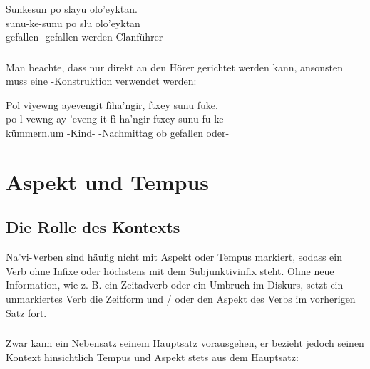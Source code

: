\begin{interlin}
	\glll \Npawl{}Sunkesun po slayu olo'eyktan. \\
	sunu-ke-sunu po slu olo'eyktan \\
	gefallen--gefallen  werden Clanführer \\
\end{interlin}

\subsubsection{} Man beachte, dass  nur direkt an den Hörer gerichtet werden kann, ansonsten muss eine -Konstruktion verwendet werden:

\begin{interlin}
	\glll \Npawl{}Pol vìyewng ayevengit fìha'ngir, ftxey sunu fuke. \\
	po-l vewng ay-'eveng-it fì-ha'ngir ftxey sunu fu-ke \\
	 kümmern.um -Kind- -Nachmittag ob gefallen oder- \\
\end{interlin}

\section{Aspekt und Tempus}

\subsection{Die Rolle des Kontexts} Na'vi-Verben sind häufig nicht mit Aspekt oder Tempus markiert, sodass ein Verb ohne Infixe oder höchstens mit dem Subjunktivinfix  steht. Ohne neue Information, wie z. B. ein Zeitadverb oder ein Umbruch im Diskurs, setzt ein unmarkiertes Verb die Zeitform und / oder den Aspekt des Verbs im vorherigen Satz fort.

\subsubsection{} Zwar kann ein Nebensatz seinem Hauptsatz vorausgehen, er bezieht jedoch seinen Kontext hinsichtlich Tempus und Aspekt stets aus dem Hauptsatz:

